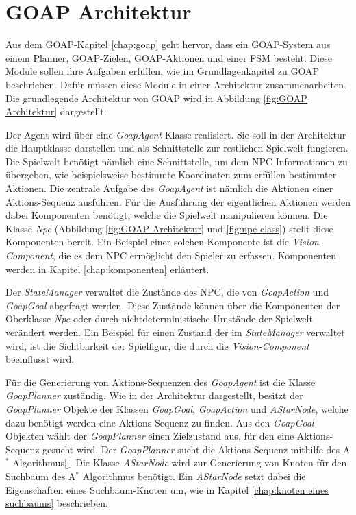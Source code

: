 \section{GOAP Architektur}
\label{chap:goap architektur}

Aus dem GOAP-Kapitel \ref{chap:goap} geht hervor, dass ein GOAP-System aus einem Planner, GOAP-Zielen, GOAP-Aktionen und einer FSM besteht. Diese Module sollen ihre Aufgaben erfüllen, wie im Grundlagenkapitel zu GOAP beschrieben. Dafür müssen diese Module in einer Architektur zusammenarbeiten. Die grundlegende Architektur von GOAP wird in Abbildung \ref{fig:GOAP Architektur} dargestellt.

Der Agent wird über eine \textit{GoapAgent} Klasse realisiert. Sie soll in der Architektur die Hauptklasse darstellen und als Schnittstelle zur restlichen Spielwelt fungieren. Die Spielwelt benötigt nämlich eine Schnittstelle, um dem NPC Informationen zu übergeben, wie beispielsweise bestimmte Koordinaten zum erfüllen bestimmter Aktionen. Die zentrale Aufgabe des \textit{GoapAgent} ist nämlich die Aktionen einer Aktions-Sequenz ausführen. Für die Ausführung der eigentlichen Aktionen werden dabei Komponenten benötigt, welche die Spielwelt manipulieren können. Die Klasse \textit{Npc} (Abbildung \ref{fig:GOAP Architektur} und \ref{fig:npc class}) stellt diese Komponenten bereit. Ein Beispiel einer solchen Komponente ist die \textit{Vision-Component}, die es dem NPC ermöglicht den Spieler zu erfassen. Komponenten werden in Kapitel \ref{chap:komponenten} erläutert.

Der \textit{StateManager} verwaltet die Zustände des NPC, die von \textit{GoapAction} und \textit{GoapGoal} abgefragt werden. Diese Zustände können über die Komponenten der Oberklasse \textit{Npc} oder durch nichtdeterministische Umstände der Spielwelt verändert werden. Ein Beispiel für einen Zustand der im \textit{StateManager} verwaltet wird, ist die Sichtbarkeit der Spielfigur, die durch die \textit{Vision-Component} beeinflusst wird.

Für die Generierung von Aktions-Sequenzen des \textit{GoapAgent} ist die Klasse \textit{GoapPlanner} zuständig. Wie in der Architektur dargestellt, besitzt der \textit{GoapPlanner} Objekte der Klassen \textit{GoapGoal}, \textit{GoapAction} und \textit{AStarNode}, welche dazu benötigt werden eine Aktions-Sequenz zu finden. Aus den \textit{GoapGoal} Objekten wählt der \textit{GoapPlanner} einen Zielzustand aus, für den eine Aktions-Sequenz gesucht wird. Der \textit{GoapPlanner} sucht die Aktions-Sequenz mithilfe des A$^*$ Algorithmus\ref{}. Die Klasse \textit{AStarNode} wird zur Generierung von Knoten für den Suchbaum des A$^*$ Algorithmus benötigt. Ein \textit{AStarNode} setzt dabei die Eigenschaften eines Suchbaum-Knoten um, wie in Kapitel \ref{chap:knoten eines suchbaums} beschrieben.


